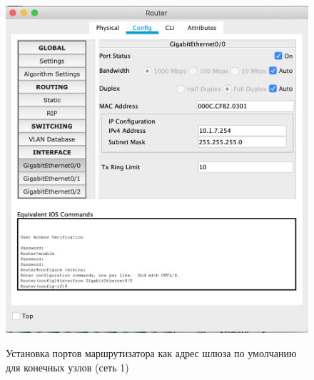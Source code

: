 \documentclass[a4paper,12pt]{article}
\begin{document}
	\begin{figure}[h!]
		\begin{center}
			{\includegraphics[scale = 0.5]{4.png}}
			\label{ris:4}
		\end{center}
		\caption{Установка портов маршрутизатора как адрес шлюза по умолчанию
			для конечных узлов (сеть 1)}
	\end{figure}
\end{document}

